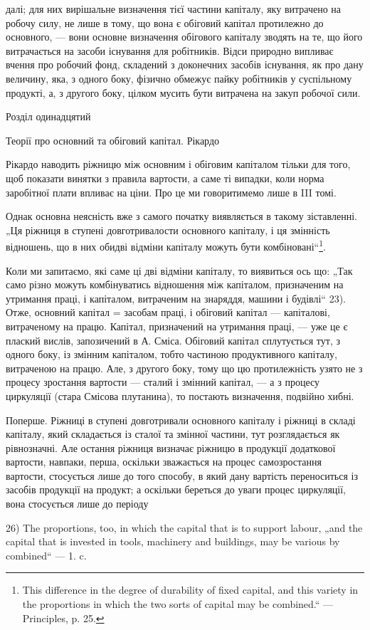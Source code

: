 \parcont{}  %
далі; для них вирішальне визначення тієї частини капіталу, яку витрачено
на робочу силу, не лише в тому, що вона є обіговий капітал протилежно
до основного, — вони основне визначення обігового капіталу зводять
на те, що його витрачається на засоби існування для робітників.
Відси природно випливає вчення про робочий фонд, складений з доконечних
засобів існування, як про дану величину, яка, з одного боку,
фізично обмежує пайку робітників у суспільному продукті, а, з другого
боку, цілком мусить бути витрачена на закуп робочої сили.

Розділ одинадцятий

Теорії про основний та обіговий капітал. Рікардо

Рікардо наводить ріжницю між основним і обіговим капіталом тільки
для того, щоб показати винятки з правила вартости, а саме ті випадки,
коли норма заробітної плати впливає на ціни. Про це ми говоритимемо
лише в III томі.

Однак основна неясність вже з самого початку виявляється в такому
зіставленні. „Ця ріжниця в ступені довготривалости основного капіталу,
і ця змінність відношень, що в них обидві відміни капіталу можуть бути
комбіновані“\footnote{
This difference in the degree of durability of fixed capital, and this variety
in the proportions in which the two sorts of capital may be combined.“ — Principles,
p. 25.
}.

Коли ми запитаємо, які саме ці дві відміни капіталу, то виявиться ось
що: „Так само різно можуть комбінуватись відношення між капіталом,
призначеним на утримання праці, і капіталом, витраченим на знаряддя,
машини і будівлі“ 23). Отже, основний капітал = засобам праці, і обіговий
капітал — капіталові, витраченому на працю. Капітал, призначений на
утримання праці, — уже це є плаский вислів, запозичений в А. Сміса.
Обіговий капітал сплутується тут, з одного боку, із змінним капіталом,
тобто частиною продуктивного капіталу, витраченою на працю. Але,
з другого боку, тому що цю протилежність узято не з процесу зростання
вартости — сталий і змінний капітал, — а з процесу циркуляції (стара Смісова
плутанина), то постають визначення, подвійно хибні.

Поперше. Ріжниці в ступені довготривали основного капіталу і
ріжниці в складі капіталу, який складається із сталої та змінної частини,
тут розглядається як рівнозначні. Але остання ріжниця визначає ріжницю
в продукції додаткової вартости, навпаки, перша, оскільки зважається на
процес самозростання вартости, стосується лише до того способу, в який
дану вартість переноситься із засобів продукції на продукт; а оскільки
береться до уваги процес циркуляції, вона стосується лише до періоду

26) The proportions, too, in which the capital that is to support labour, „and the
capital that is invested in tools, machinery and buildings, may be various by combined“
— 1. c.
\parbreak{}  %
